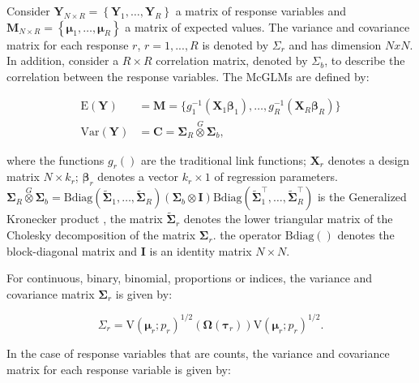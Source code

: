 \documentclass[article]{jss}\usepackage[]{graphicx}\usepackage[]{xcolor}
\begin{document}
Consider $\boldsymbol{Y}_{N \times R} = \left \{ \boldsymbol{Y}_1, \dots, \boldsymbol{Y}_R \right \}$ a matrix of response variables and $\boldsymbol{M}_{N \times R} = \left \{ \boldsymbol{\mu}_1, \dots, \boldsymbol{\mu}_R \right \}$ a matrix of expected values. The variance and covariance matrix for each response $r$, $r = 1,..., R$ is denoted by $\Sigma_r$ and has dimension $NxN$. In addition, consider a $R \times R$ correlation matrix, denoted by $\Sigma_b$, to describe the correlation between the response variables. The McGLMs \citep{Bonat16} are defined by:

$$
      \begin{aligned}
        \mathrm{E}(\boldsymbol{Y}) &=
          \boldsymbol{M} =
            \{g_1^{-1}(\boldsymbol{X}_1 \boldsymbol{\beta}_1),
            \ldots,
            g_R^{-1}(\boldsymbol{X}_R \boldsymbol{\beta}_R)\}
          \\
        \mathrm{Var}(\boldsymbol{Y}) &=
          \boldsymbol{C} =
            \boldsymbol{\Sigma}_R \overset{G} \otimes
            \boldsymbol{\Sigma}_b,
      \end{aligned}
$$

\noindent where the functions $g_r()$ are the traditional link functions; $\boldsymbol{X}_r$ denotes a design matrix $N \times k_r$; $\boldsymbol{\beta}_r$ denotes a vector $k_r \times 1$ of regression parameters. $\boldsymbol{\Sigma}_R \overset{G} \otimes \boldsymbol{\Sigma}_b = \mathrm{Bdiag}(\tilde{\boldsymbol{\Sigma}}_1, \ldots, \tilde{\boldsymbol{\Sigma}}_R) (\boldsymbol{\Sigma}_b \otimes \boldsymbol{I}) \mathrm{Bdiag}(\tilde{\boldsymbol{\Sigma}}_1^\top, \ldots, \tilde{\boldsymbol{\Sigma}}_R^\top)$ is the Generalized Kronecker product \citep{martinez13}, the matrix $\tilde{\boldsymbol{\Sigma}}_r$ denotes the lower triangular matrix of the Cholesky decomposition of the matrix ${\boldsymbol{\Sigma}}_r$. the operator $\mathrm{Bdiag()}$ denotes the block-diagonal matrix and $\boldsymbol{I}$ is an identity matrix $N \times N$. 

For continuous, binary, binomial, proportions or indices, the variance and covariance matrix $\boldsymbol{\Sigma}_r$ is given by:

$$
\Sigma_r =
\mathrm{V}\left(\boldsymbol{\mu}_r; p_r\right)^{1/2}(\boldsymbol{\Omega}\left(\boldsymbol{\tau}_r\right))\mathrm{V}\left(\boldsymbol{\mu}_r; p_r\right)^{1/2}.
$$

In the case of response variables that are counts, the variance and covariance matrix for each response variable is given by:
\end{document}
